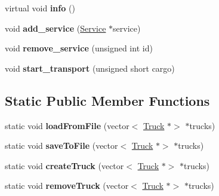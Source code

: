 \begin{DoxyCompactItemize}
virtual void {\bfseries info} ()
\item 
\mbox{\label{class_truck_a03c8acd51c35f24db74cd8b2ee20cacb}} 
void {\bfseries add\+\_\+service} (\hyperlink{class_service}{Service} $\ast$service)
\item 
\mbox{\label{class_truck_a0abc7397fd6dba0eeeb2b5ae3e225fd1}} 
void {\bfseries remove\+\_\+service} (unsigned int id)
\item 
\mbox{\label{class_truck_aca68ecb83bcdc73de6bd381dccb70e4d}} 
void {\bfseries start\+\_\+transport} (unsigned short cargo)
\end{DoxyCompactItemize}
\subsection*{Static Public Member Functions}
\begin{DoxyCompactItemize}
\item 
\mbox{\label{class_truck_ae2d129e4cdd6760feee9a81421d40e17}} 
static void {\bfseries load\+From\+File} (vector$<$ \hyperlink{class_truck}{Truck} $\ast$$>$ $\ast$trucks)
\item 
\mbox{\label{class_truck_ad03e7d588f7f6dc24e1423e2e481ad3a}} 
static void {\bfseries save\+To\+File} (vector$<$ \hyperlink{class_truck}{Truck} $\ast$$>$ $\ast$trucks)
\item 
\mbox{\label{class_truck_a4b2a202b4fe0bf70249493a9aa30f5dd}} 
static void {\bfseries create\+Truck} (vector$<$ \hyperlink{class_truck}{Truck} $\ast$$>$ $\ast$trucks)
\item 
\mbox{\label{class_truck_acb3e375dfa4ba812de7e65f0b3e37ded}} 
static void {\bfseries remove\+Truck} (vector$<$ \hyperlink{class_truck}{Truck} $\ast$$>$ $\ast$trucks)
\end{DoxyCompactItemize}
